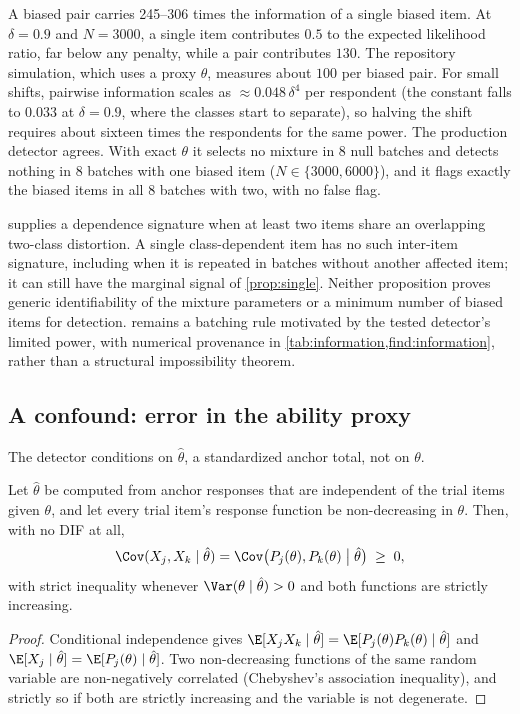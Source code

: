 \begin{finding}\label{find:information}\empirical{}
A biased pair carries 245--306 times the information of a single biased item. At $\delta=0.9$
and $N=3000$, a single item contributes $0.5$ to the expected likelihood ratio, far below any
penalty, while a pair contributes $130$. The repository simulation, which uses a proxy $\theta$,
measures about $100$ per biased pair. For small shifts, pairwise information scales as
$\approx0.048\,\delta^4$ per respondent (the constant falls to $0.033$ at $\delta=0.9$, where the
classes start to separate), so halving the shift requires about sixteen times the respondents for
the same power. The production detector agrees. With exact $\theta$ it selects no mixture in 8
null batches and detects nothing in 8 batches with one biased item ($N\in\{3000,6000\}$), and it
flags exactly the biased items in all 8 batches with two, with no false flag.
\end{finding}

 supplies a dependence signature when at least two items share an overlapping
two-class distortion. A single class-dependent item has no such inter-item signature, including
when it is repeated in batches without another affected item; it can still have the marginal
signal of \cref{prop:single}. Neither proposition proves generic identifiability of the
mixture parameters or a minimum number of biased items for detection.  remains
a batching rule motivated by the tested detector's limited power, with numerical provenance in
\cref{tab:information,find:information}, rather than a structural impossibility theorem.

\subsection{A confound: error in the ability proxy}\label{sec:proxy}

The detector conditions on $\hat\theta$, a standardized anchor total, not on $\theta$.

\begin{proposition}\label{prop:proxy}\proved{}
Let $\hat\theta$ be computed from anchor responses that are independent of the trial items
given $\theta$, and let every trial item's response function be non-decreasing in $\theta$.
Then, with no DIF at all,
\begin{equation}
  \Cov(X_j,X_k\mid\hat\theta)=\Cov\bigl(P_j(\theta),P_k(\theta)\bigm|\hat\theta\bigr)\;\ge\;0,
\end{equation}
with strict inequality whenever $\Var(\theta\mid\hat\theta)>0$ and both functions are strictly
increasing.
\end{proposition}
\begin{proof}
Conditional independence gives $\E[X_jX_k\mid\hat\theta]=\E[P_j(\theta)P_k(\theta)\mid\hat\theta]$
and $\E[X_j\mid\hat\theta]=\E[P_j(\theta)\mid\hat\theta]$. Two non-decreasing functions of the
same random variable are non-negatively correlated (Chebyshev's association inequality), and
strictly so if both are strictly increasing and the variable is not degenerate.
\end{proof}

